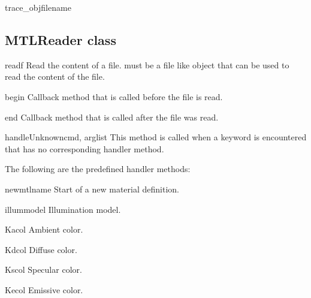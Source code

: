 \begin{methoddesc}{trace_obj}{filename}
\end{methoddesc}


\subsection{MTLReader class}

\begin{methoddesc}{read}{f}
Read the content of a file.  must be a file like object that
can be used to read the content of the file.
\end{methoddesc}

\begin{methoddesc}{begin}{}
Callback method that is called before the file is read.
\end{methoddesc}

\begin{methoddesc}{end}{}
Callback method that is called after the file was read.
\end{methoddesc}

\begin{methoddesc}{handleUnknown}{cmd, arglist}
This method is called when a keyword is encountered that has no 
corresponding handler method.
\end{methoddesc}

The following are the predefined handler methods:

\begin{methoddesc}{newmtl}{name}
Start of a new material definition.
\end{methoddesc}

\begin{methoddesc}{illum}{model}
Illumination model.
\end{methoddesc}

\begin{methoddesc}{Ka}{col}
Ambient color.
\end{methoddesc}

\begin{methoddesc}{Kd}{col}
Diffuse color.
\end{methoddesc}

\begin{methoddesc}{Ks}{col}
Specular color.
\end{methoddesc}

\begin{methoddesc}{Ke}{col}
Emissive color.
\end{methoddesc}

